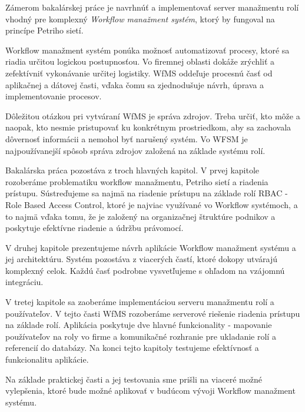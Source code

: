 Zámerom bakalárskej práce je navrhnúť a implementovať server manažmentu rolí vhodný pre komplexný \emph{Workflow manažment systém}, ktorý by fungoval na princípe Petriho sietí.

Workflow manažment systém ponúka možnosť automatizovať procesy, ktoré sa riadia určitou logickou postupnosťou. Vo firemnej oblasti dokáže zrýchliť a zefektívniť vykonávanie určitej logistiky. WfMS oddeľuje procesnú časť od aplikačnej a dátovej časti, vďaka čomu sa zjednodušuje návrh, úprava a implementovanie procesov.

Dôležitou otázkou pri vytváraní WfMS je správa zdrojov.
Treba určiť, kto môže a naopak, kto nesmie pristupovať ku konkrétnym prostriedkom,
aby sa zachovala dôvernosť informácii a nemohol byť narušený systém. Vo WFSM je
najpoužívanejší spôsob správa zdrojov založená na základe systému rolí.
 
Bakalárska práca pozostáva z troch hlavných kapitol. V prvej kapitole rozoberáme problematiku workflow manažmentu, Petriho sietí a riadenia prístupu. Sústreďujeme sa najmä na riadenie prístupu na základe rolí RBAC - Role Based Access Control, ktoré je najviac využívané vo Workflow systémoch, a to najmä vďaka tomu, že je založený na
organizačnej štruktúre podnikov a poskytuje efektívne riadenie a údržbu právomocí. 

V druhej kapitole prezentujeme návrh aplikácie Workflow  manažment systému a jej architektúru. Systém pozostáva z viacerých častí, ktoré dokopy utvárajú komplexný celok. Každú časť podrobne vysvetľujeme s ohľadom na vzájomnú integráciu.

V tretej kapitole sa zaoberáme  implementáciou serveru manažmentu rolí a používateľov. V tejto časti WfMS rozoberáme serverové riešenie riadenia prístupu na základe rolí. Aplikácia poskytuje dve hlavné funkcionality - mapovanie používateľov na roly vo firme a komunikačné rozhranie pre ukladanie rolí a referencií do databázy. Na konci tejto kapitoly testujeme efektívnosť a funkcionalitu aplikácie.

Na základe praktickej časti a jej testovania sme prišli na viaceré možné vylepšenia, ktoré bude možné aplikovať v budúcom vývoji Workflow manažment systému. 




 




















